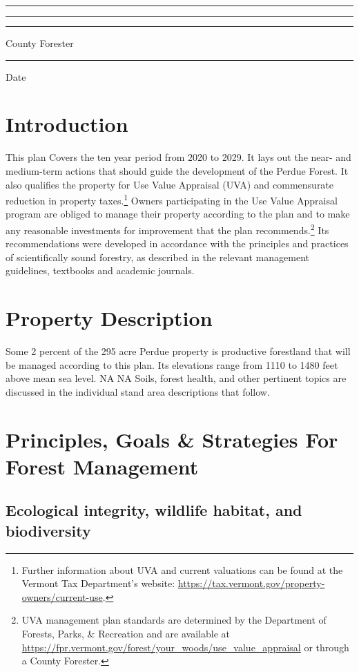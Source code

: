 \documentclass[]{tufte-handout}
\begin{document}
\noindent\rule{9cm}{0.4pt} \rule{.3cm}{0pt} \rule{4cm}{0.4pt}

\noindent County Forester \rule{7cm}{0pt} Date

\pagebreak

\section{Introduction}\label{introduction}

This plan Covers the ten year period from 2020 to 2029. It lays out the
near- and medium-term actions that should guide the development of the
Perdue Forest. It also qualifies the property for Use Value Appraisal
(UVA) and commensurate reduction in property taxes.\footnote{Further
  information about UVA and current valuations can be found at the
  Vermont Tax Department's website:
  \url{https://tax.vermont.gov/property-owners/current-use}.
  \vspace{20pt}} Owners participating in the Use Value Appraisal program
are obliged to manage their property according to the plan and to make
any reasonable investments for improvement that the plan
recommends.\footnote{UVA management plan standards are determined by the
  Department of Forests, Parks, \& Recreation and are available at
  \url{https://fpr.vermont.gov/forest/your_woods/use_value_appraisal} or
  through a County Forester.} Its recommendations were developed in
accordance with the principles and practices of scientifically sound
forestry, as described in the relevant management guidelines, textbooks
and academic journals.

\section{Property Description}\label{property-description}

Some 2 percent of the 295 acre Perdue property is productive forestland
that will be managed according to this plan. Its elevations range from
1110 to 1480 feet above mean sea level. NA NA Soils, forest health, and
other pertinent topics are discussed in the individual stand area
descriptions that follow.

\section{Principles, Goals \& Strategies For Forest
Management}\label{principles-goals-strategies-for-forest-management}

\subsection{Ecological integrity, wildlife habitat, and
biodiversity}\label{ecological-integrity-wildlife-habitat-and-biodiversity}
\end{document}
